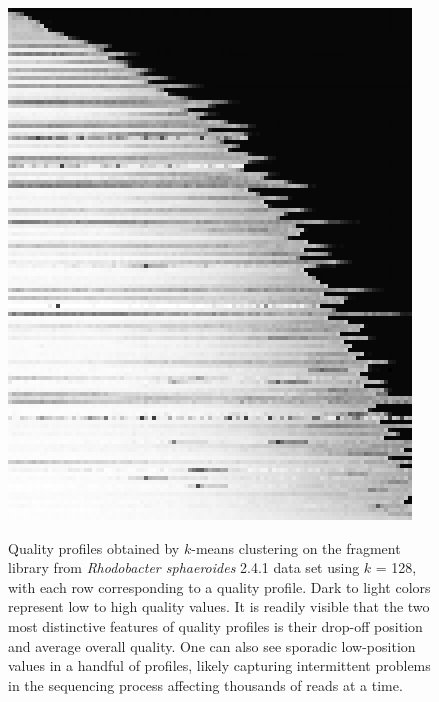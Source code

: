 \documentclass[12pt,\mydriver]{thesis}
\begin{document}
\begin{figure}[!tpb]\begin{center}
\includegraphics[width=.9\textwidth]{profiles_128.png}
\end{center}
\renewcommand{\baselinestretch}{1}
\small\normalsize
\begin{quote}
\caption[Quality profiles obtained by $k$-means clustering on the
  fragment library from \textit{Rhodobacter sphaeroides} 2.4.1 data
  set]{Quality profiles obtained by $k$-means clustering on the
  fragment library from \textit{Rhodobacter sphaeroides} 2.4.1 data
  set using $k$ = 128, with each row corresponding to a quality
  profile. Dark to light colors represent low to high quality
  values. It is readily visible that the two most distinctive features
  of quality profiles is their drop-off position and average overall
  quality. One can also see sporadic low-position values in a handful
  of profiles, likely capturing intermittent problems in the
  sequencing process affecting thousands of reads at a
  time.}
  \label{fig:profiles_128}
\end{quote}
\end{figure}
\renewcommand{\baselinestretch}{2}
\small\normalsize
\end{document}
